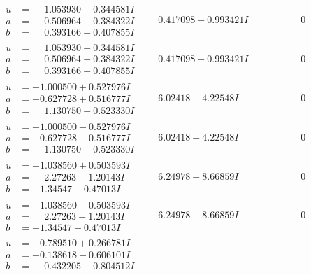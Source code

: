 \documentclass[1p]{elsarticle_modified}
\theoremstyle{definition}
\begin{document}
$$\begin{array}{c|c|c}
\begin{aligned}
u &= \phantom{-}1.053930 + 0.344581 I \\
a &= \phantom{-}0.506964 - 0.384322 I \\
b &= \phantom{-}0.393166 - 0.407855 I\end{aligned}
 & \phantom{-}0.417098 + 0.993421 I & \phantom{-0.000000 } 0 \\ \hline\begin{aligned}
u &= \phantom{-}1.053930 - 0.344581 I \\
a &= \phantom{-}0.506964 + 0.384322 I \\
b &= \phantom{-}0.393166 + 0.407855 I\end{aligned}
 & \phantom{-}0.417098 - 0.993421 I & \phantom{-0.000000 } 0 \\ \hline\begin{aligned}
u &= -1.000500 + 0.527976 I \\
a &= -0.627728 + 0.516777 I \\
b &= \phantom{-}1.130750 + 0.523330 I\end{aligned}
 & \phantom{-}6.02418 + 4.22548 I & \phantom{-0.000000 } 0 \\ \hline\begin{aligned}
u &= -1.000500 - 0.527976 I \\
a &= -0.627728 - 0.516777 I \\
b &= \phantom{-}1.130750 - 0.523330 I\end{aligned}
 & \phantom{-}6.02418 - 4.22548 I & \phantom{-0.000000 } 0 \\ \hline\begin{aligned}
u &= -1.038560 + 0.503593 I \\
a &= \phantom{-}2.27263 + 1.20143 I \\
b &= -1.34547 + 0.47013 I\end{aligned}
 & \phantom{-}6.24978 - 8.66859 I & \phantom{-0.000000 } 0 \\ \hline\begin{aligned}
u &= -1.038560 - 0.503593 I \\
a &= \phantom{-}2.27263 - 1.20143 I \\
b &= -1.34547 - 0.47013 I\end{aligned}
 & \phantom{-}6.24978 + 8.66859 I & \phantom{-0.000000 } 0 \\ \hline\begin{aligned}
u &= -0.789510 + 0.266781 I \\
a &= -0.138618 - 0.606101 I \\
b &= \phantom{-}0.432205 - 0.804512 I\end{aligned}

\end{array}$$
\end{document}

